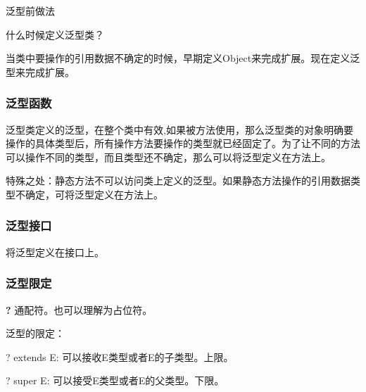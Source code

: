 \documentclass[UTF8]{ctexart}
\begin{document}
泛型前做法

什么时候定义泛型类？

当类中要操作的引用数据不确定的时候，早期定义Object来完成扩展。现在定义泛型来完成扩展。



\subsubsection{泛型函数}

\textbullet 泛型类定义的泛型，在整个类中有效,如果被方法使用，那么泛型类的对象明确要操作的具体类型后，所有操作方法要操作的类型就已经固定了。为了让不同的方法可以操作不同的类型，而且类型还不确定，那么可以将泛型定义在方法上。

\textbullet 特殊之处：静态方法不可以访问类上定义的泛型。如果静态方法操作的引用数据类型不确定，可将泛型定义在方法上。


\subsubsection{泛型接口}

将泛型定义在接口上。

\subsubsection{泛型限定}

\textbullet \textbf{?} 通配符。也可以理解为占位符。

泛型的限定：

\textbullet ? extends E: 可以接收E类型或者E的子类型。上限。

\textbullet ? super E: 可以接受E类型或者E的父类型。下限。


\end{document}
